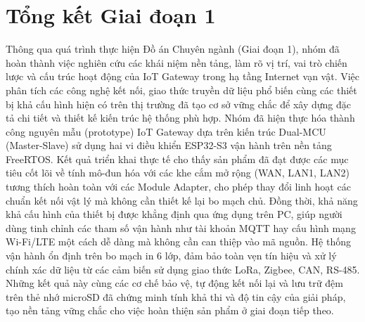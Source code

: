 \section{Tổng kết Giai đoạn 1}
    Thông qua quá trình thực hiện Đồ án Chuyên ngành (Giai đoạn 1), nhóm đã hoàn thành việc nghiên cứu các khái niệm nền tảng, làm rõ vị trí, vai trò chiến lược và cấu trúc hoạt động của IoT Gateway trong hạ tầng Internet vạn vật. Việc phân tích các công nghệ kết nối, giao thức truyền dữ liệu phổ biến cùng các thiết bị khả cấu hình hiện có trên thị trường đã tạo cơ sở vững chắc để xây dựng đặc tả chi tiết và thiết kế kiến trúc hệ thống phù hợp. Nhóm đã hiện thực hóa thành công nguyên mẫu (prototype) IoT Gateway dựa trên kiến trúc Dual-MCU (Master-Slave) sử dụng hai vi điều khiển ESP32-S3 vận hành trên nền tảng FreeRTOS. Kết quả triển khai thực tế cho thấy sản phẩm đã đạt được các mục tiêu cốt lõi về tính mô-đun hóa với các khe cắm mở rộng (WAN, LAN1, LAN2) tương thích hoàn toàn với các Module Adapter, cho phép thay đổi linh hoạt các chuẩn kết nối vật lý mà không cần thiết kế lại bo mạch chủ. Đồng thời, khả năng khả cấu hình của thiết bị được khẳng định qua ứng dụng trên PC, giúp người dùng tinh chỉnh các tham số vận hành như tài khoản MQTT hay cấu hình mạng Wi-Fi/LTE một cách dễ dàng mà không cần can thiệp vào mã nguồn. Hệ thống vận hành ổn định trên bo mạch in 6 lớp, đảm bảo toàn vẹn tín hiệu và xử lý chính xác dữ liệu từ các cảm biến sử dụng giao thức LoRa, Zigbee, CAN, RS-485. Những kết quả này cùng các cơ chế bảo vệ, tự động kết nối lại và lưu trữ đệm trên thẻ nhớ microSD đã chứng minh tính khả thi và độ tin cậy của giải pháp, tạo nền tảng vững chắc cho việc hoàn thiện sản phẩm ở giai đoạn tiếp theo.